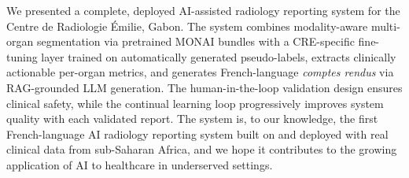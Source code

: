 \documentclass[conference]{IEEEtran}
\begin{document}
We presented a complete, deployed AI-assisted radiology reporting system for the
Centre de Radiologie \'{E}milie, Gabon. The system combines modality-aware
multi-organ segmentation via pretrained MONAI bundles with a CRE-specific
fine-tuning layer trained on automatically generated pseudo-labels, extracts
clinically actionable per-organ metrics, and generates French-language
\textit{comptes rendus} via RAG-grounded LLM generation. The human-in-the-loop
validation design ensures clinical safety, while the continual learning loop
progressively improves system quality with each validated report. The system
is, to our knowledge, the first French-language AI radiology reporting system
built on and deployed with real clinical data from sub-Saharan Africa, and we
hope it contributes to the growing application of AI to healthcare in
underserved settings.
\end{document}
